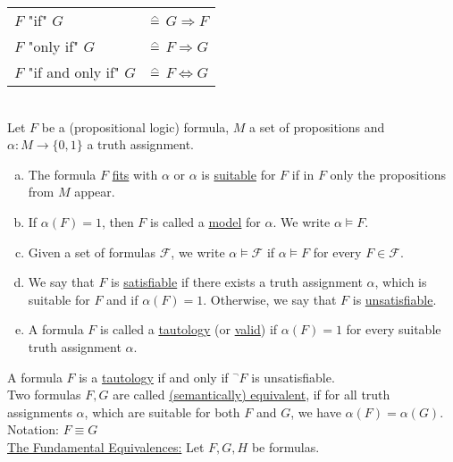 \documentclass[a4paper]{article}
\renewcommand\hateq{\mathrel{\stackon[1.5pt]{=}{\stretchto{%
				\scalerel*[\widthof{=}]{\wedge}{\rule{1ex}{3ex}}}{0.5ex}}}}
\newcommand{\ul}{\underline}
\begin{document}
\begin{tabular}{ll}
$F$ "if" $G$ & $\hateq$ $G\Rightarrow F$\\
$F$ "only if" $G$ & $\hateq$ $F\Rightarrow G$\\
$F$ "if and only if" $G$ & $\hateq$ $F\Leftrightarrow G$\\
\end{tabular}\\
Let $F$ be a (propositional logic) formula, $M$ a set of propositions and $\alpha:M\rightarrow\{0,1\}$ a truth assignment.
\begin{enumerate}[(a)]
	\item The formula $F$ \ul{fits} with $\alpha$ or $\alpha$ is \ul{suitable} for $F$ if in $F$ only the propositions from $M$ appear.
	\item If $\alpha(F)=1$, then $F$ is called a \ul{model} for $\alpha$. We write $\alpha\models F$.
	\item Given a set of formulas $\mathcal{F}$, we write $\alpha\models \mathcal{F}$ if $\alpha\models F$ for every $F\in\mathcal{F}$.
	\item We say that $F$ is \ul{satisfiable} if there exists a truth assignment $\alpha$, which is suitable for $F$ and if $\alpha(F)=1$. Otherwise, we say that $F$ is \ul{unsatisfiable}.
	\item A formula $F$ is called a \ul{tautology} (or \ul{valid}) if $\alpha(F)=1$ for every suitable truth assignment $\alpha$.
\end{enumerate}
A formula $F$ is a \ul{tautology} if and only if $^\neg F$ is unsatisfiable.\\
Two formulas $F,G$ are called \ul{(semantically) equivalent}, if for all truth assignments $\alpha$, which are suitable for both $F$ and $G$, we have $\alpha(F)=\alpha(G)$. Notation: $F\equiv G$\\
\ul{The Fundamental Equivalences:}
Let $F,G,H$ be formulas.
\end{document}
